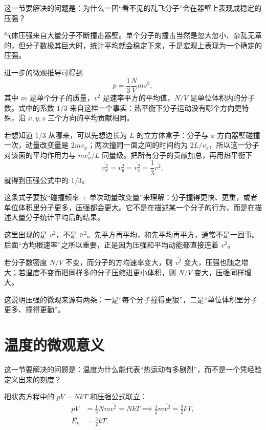 \documentclass[lang=cn,11pt]{elegantbook}
\newcommand{\bridge}[1]{\begin{note}#1\end{note}}
\begin{document}
这一节要解决的问题是：为什么一团“看不见的乱飞分子”会在器壁上表现成稳定的压强？

气体压强来自大量分子不断撞击器壁。单个分子的撞击当然是忽大忽小、杂乱无章的，但分子数极其巨大时，统计平均就会稳定下来，于是宏观上表现为一个确定的压强。

进一步的微观推导可得到
\[
p=\frac{1}{3}\frac{N}{V}m\overline{v^2},
\]
其中 \(m\) 是单个分子的质量，\(\overline{v^2}\) 是速率平方的平均值，\(N/V\) 是单位体积内的分子数。式中的系数 \(1/3\) 来自这样一个事实：热平衡下分子运动没有哪个方向更特殊，沿 \(x,y,z\) 三个方向的平均贡献相同。

\begin{note}
若想知道 \(1/3\) 从哪来，可以先想边长为 \(L\) 的立方体盒子：分子与 \(x\) 方向器壁碰撞一次，动量改变量是 \(2mv_x\)；两次撞同一面之间的时间约为 \(2L/v_x\)，所以这一分子对该面的平均作用力与 \(mv_x^2/L\) 同量级。把所有分子的贡献加总，再用热平衡下
\[
\overline{v_x^2}=\overline{v_y^2}=\overline{v_z^2}=\frac{1}{3}\overline{v^2},
\]
就得到压强公式中的 \(1/3\)。
\end{note}

\bridge{这条式子要按“碰撞频率 + 单次动量改变量”来理解：分子撞得更快、更重，或者单位体积里分子更多，压强都会更大。它不是在描述某一个分子的行为，而是在描述大量分子统计平均后的结果。}

\begin{remark}
这里出现的是 \(\overline{v^2}\)，不是 \(\bar v^{\,2}\)。先平方再平均，和先平均再平方，通常不是一回事。后面“方均根速率”之所以重要，正是因为压强和平均动能都直接连着 \(\overline{v^2}\)。
\end{remark}

\begin{example}[怎样从公式读出压强大小规律]
若分子数密度 \(N/V\) 不变，而分子的方均速率变大，则 \(\overline{v^2}\) 变大，压强也随之增大；若温度不变而把同样多的分子压缩进更小体积，则 \(N/V\) 变大，压强同样增大。

这说明压强的微观来源有两条：一是“每个分子撞得更狠”，二是“单位体积里分子更多、撞得更勤”。
\end{example}

\section{温度的微观意义}

这一节要解决的问题是：温度为什么能代表“热运动有多剧烈”，而不是一个凭经验定义出来的刻度？

把状态方程中的 \(pV=NkT\) 和压强公式联立：
\[
\begin{aligned}
pV&=\frac{1}{3}Nm\overline{v^2}=NkT
\implies
\frac{1}{2}m\overline{v^2}=\frac{3}{2}kT,\\
\overline{E_k}&=\frac{3}{2}kT.
\end{aligned}
\]
\end{document}
